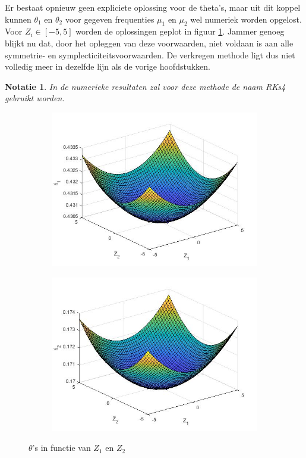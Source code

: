 \documentclass[12pt]{article}
\newtheorem{nta}[defn]{Notatie}
\begin{document}
Er bestaat opnieuw geen expliciete oplossing voor de theta's, maar uit dit koppel kunnen \(\theta_1\) en \(\theta_2\) voor gegeven frequenties \(\mu_1\) en \(\mu_2\) wel numeriek worden opgelost. Voor \(Z_i\in[-5,5]\) worden de oplossingen geplot in figuur \ref{fig:thetagraphs4}. Jammer genoeg blijkt nu dat, door het opleggen van deze voorwaarden, niet voldaan is aan alle symmetrie- en symplecticiteitsvoorwaarden. De verkregen methode ligt dus niet volledig meer in dezelfde lijn als de vorige hoofdstukken.
\begin{nta}
In de numerieke resultaten zal voor deze methode de naam RKs4 gebruikt worden.
\end{nta}
\begin{figure}[H]
    \centering
    \begin{subfigure}{0.49\textwidth}
        \includegraphics[width=\textwidth]{thetagraphs4_1.jpg}
    \end{subfigure}
    \begin{subfigure}{0.49\textwidth}
        \includegraphics[width=\textwidth]{thetagraphs4_2.jpg}
    \end{subfigure}
    \caption{\(\theta\)'s in functie van \(Z_1\) en \(Z_2\)}
    \label{fig:thetagraphs4}
\end{figure}
\end{document}
